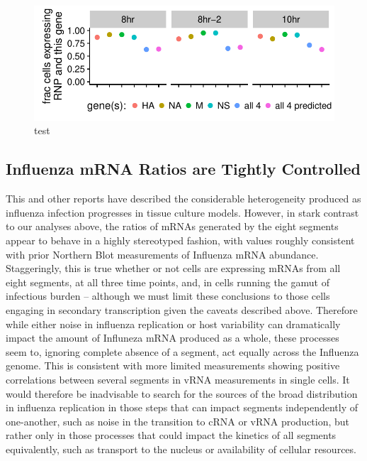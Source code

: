\documentclass[9pt,lineno]{elife}
\begin{document}
\begin{figure}
\includegraphics[width=0.6\linewidth]{figures/p_missing_genes.pdf}
\caption{\label{fig:missingseg}
test
}
\end{figure}


	
\subsection{Influenza mRNA Ratios are Tightly Controlled}
	
	This and other reports have described the considerable heterogeneity produced as influenza infection progresses in tissue culture models. However, in stark contrast to our analyses above, the ratios of mRNAs generated by the eight segments appear to behave in a highly stereotyped fashion, with values roughly consistent with prior Northern Blot measurements of Influenza mRNA abundance. Staggeringly, this is true whether or not cells are expressing mRNAs from all eight segments, at all three time points,  and, in cells running the gamut of infectious burden -- although we must limit these conclusions to those cells engaging in secondary transcription given the caveats described above. Therefore while either noise in influenza replication or host variability can dramatically impact the amount of Influneza mRNA produced as a whole, these processes seem to, ignoring complete absence of a segment, act equally across the Influenza genome. This is consistent with more limited measurements showing positive correlations between several segments in vRNA measurements in single cells. It would therefore be inadvisable to search for the sources of the broad distribution in influenza replication in those steps that can impact segments independently of one-another, such as noise in the transition to cRNA or vRNA production, but rather only in those processes that could impact the kinetics of all segments equivalently, such as transport to the nucleus or availability of cellular resources. 
\end{document}
